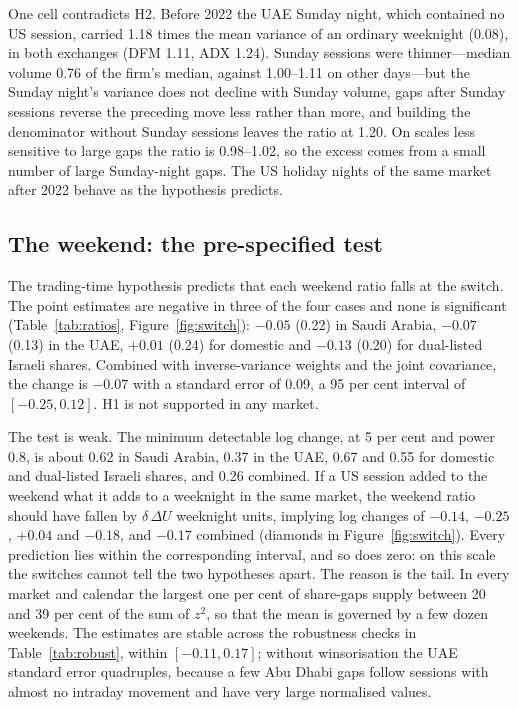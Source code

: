 One cell contradicts H2. Before 2022 the UAE Sunday night, which contained no US session, carried 1.18 times the mean variance of an ordinary weeknight (0.08), in both exchanges (DFM 1.11, ADX 1.24). Sunday sessions were thinner---median volume 0.76 of the firm's median, against 1.00--1.11 on other days---but the Sunday night's variance does not decline with Sunday volume, gaps after Sunday sessions reverse the preceding move less rather than more, and building the denominator without Sunday sessions leaves the ratio at 1.20. On scales less sensitive to large gaps the ratio is 0.98--1.02, so the excess comes from a small number of large Sunday-night gaps. The US holiday nights of the same market after 2022 behave as the hypothesis predicts.

\subsection{The weekend: the pre-specified test}
The trading-time hypothesis predicts that each weekend ratio falls at the switch. The point estimates are negative in three of the four cases and none is significant (Table~\ref{tab:ratios}, Figure~\ref{fig:switch}): $-0.05$ (0.22) in Saudi Arabia, $-0.07$ (0.13) in the UAE, $+0.01$ (0.24) for domestic and $-0.13$ (0.20) for dual-listed Israeli shares. Combined with inverse-variance weights and the joint covariance, the change is $-0.07$ with a standard error of 0.09, a 95 per cent interval of $[-0.25, 0.12]$. H1 is not supported in any market.

The test is weak. The minimum detectable log change, at 5 per cent and power 0.8, is about 0.62 in Saudi Arabia, 0.37 in the UAE, 0.67 and 0.55 for domestic and dual-listed Israeli shares, and 0.26 combined. If a US session added to the weekend what it adds to a weeknight in the same market, the weekend ratio should have fallen by $\delta\,\Delta U$ weeknight units, implying log changes of $-0.14$, $-0.25$, $+0.04$ and $-0.18$, and $-0.17$ combined (diamonds in Figure~\ref{fig:switch}). Every prediction lies within the corresponding interval, and so does zero: on this scale the switches cannot tell the two hypotheses apart. The reason is the tail. In every market and calendar the largest one per cent of share-gaps supply between 20 and 39 per cent of the sum of $z^2$, so that the mean is governed by a few dozen weekends. The estimates are stable across the robustness checks in Table~\ref{tab:robust}, within $[-0.11, 0.17]$; without winsorisation the UAE standard error quadruples, because a few Abu Dhabi gaps follow sessions with almost no intraday movement and have very large normalised values.

